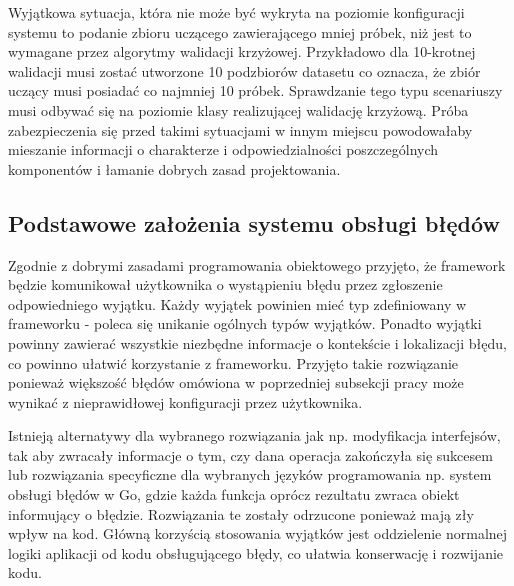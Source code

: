 \documentclass[12pt]{article}
\begin{document}
Wyjątkowa sytuacja, która nie może być wykryta na poziomie konfiguracji systemu to podanie zbioru uczącego zawierającego mniej próbek, niż jest to wymagane przez algorytmy walidacji krzyżowej. Przykładowo dla 10-krotnej walidacji musi zostać utworzone 10 podzbiorów datasetu co oznacza, że zbiór uczący musi posiadać co najmniej 10 próbek. Sprawdzanie tego typu scenariuszy musi odbywać się na poziomie klasy realizującej walidację krzyżową. Próba zabezpieczenia się przed takimi sytuacjami w innym miejscu powodowałaby mieszanie informacji o charakterze i odpowiedzialności poszczególnych komponentów i łamanie dobrych zasad projektowania.

\subsection{Podstawowe założenia systemu obsługi błędów}

Zgodnie z dobrymi zasadami programowania obiektowego \cite{clean-code} przyjęto, że framework będzie komunikował użytkownika o wystąpieniu błędu przez zgłoszenie odpowiedniego wyjątku. Każdy wyjątek powinien mieć typ zdefiniowany w frameworku - poleca się unikanie ogólnych typów wyjątków. Ponadto wyjątki powinny zawierać wszystkie niezbędne informacje o kontekście i lokalizacji błędu, co powinno ułatwić korzystanie z frameworku. Przyjęto takie rozwiązanie ponieważ większość błędów omówiona w poprzedniej subsekcji pracy może wynikać z nieprawidłowej konfiguracji przez użytkownika. 

Istnieją alternatywy dla wybranego rozwiązania jak np. modyfikacja interfejsów, tak aby zwracały informacje o tym, czy dana operacja zakończyła się sukcesem lub rozwiązania specyficzne dla wybranych języków programowania np. system obsługi błędów w Go, gdzie każda funkcja oprócz rezultatu zwraca obiekt informujący o błędzie. Rozwiązania te zostały odrzucone ponieważ mają zły wpływ na kod. Główną korzyścią stosowania wyjątków jest oddzielenie normalnej logiki aplikacji od kodu obsługującego błędy, co ułatwia konserwację i rozwijanie kodu. 
\end{document}

